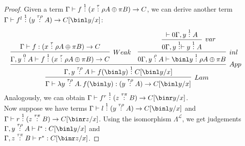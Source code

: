 \documentclass[12pt,a4paper]{article}
\begin{document}
\begin{proof}
Given a term $\Gamma \vdash f \overset{1}{:} (x \overset{\tau}{:} \rho A \oplus \pi B) \to C$, we can derive another term\\ $\Gamma \vdash f^l \of{1} ( y \of {\tau \rho} A) \to C[\binl y /x]$:
$$
\infer[Lam]{\Gamma \vdash \lambda y \of{\tau\rho} A .\, f (\binl y) : (y \of {\tau \rho} A) \to C[\binl y / x]}{
  \infer[App]{\Gamma , y \of{\tau\rho} A \vdash f(\binl y) \of{1} C[\binl y /x] }{
    \infer[Weak]{\Gamma , y \of{0} A \vdash f \of{1} (x \of\tau \rho A \oplus \pi B) \to C}{
      \Gamma \vdash f : (x \of \tau \rho A \oplus \pi B) \to C
    }
    &
    \infer[inl]{0\Gamma, y \of\rho A \vdash \binl y \of{1}\rho A \oplus \pi B}{
      \infer[var]{0\Gamma, y \of{1} \vdash y \of{1} A}{
       \vdash 0\Gamma, y \of{1} A
      }
    }
  }
}
$$
Analogously, we can obtain $\Gamma \vdash f^r \of{1} (z \of{\tau\pi} B) \to C[\binr y /x]$.\\
Now suppose we have terms $\Gamma \vdash l \of{1} (y \of{\tau \rho} A) \to C[\binl y /x]$ and $\Gamma \vdash r \of{1} (z \of{\tau \pi} B) \to C[\binr z / x]$. Using the isomorphism $\Lambda^\mathcal{L}$, we get judgements $ \Gamma, y \of{\tau \rho} A \vdash l^* : C[\binl y / x]$ and\\ $\Gamma , z \of {\tau \pi} B \vdash r^* : C[\binr z /x]$.
\end{proof}
\end{document}
